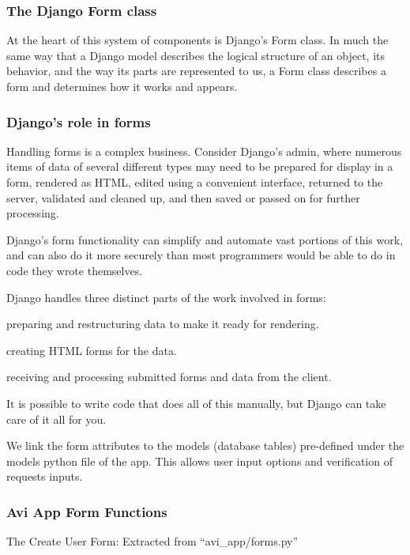 \documentclass[10pt]{article}
\begin{document}
\subsubsection{The Django Form class}
At the heart of this system of components is Django’s Form class. In much the same way that a Django model describes the logical structure of an object, its behavior, and the way its parts are represented to us, a Form class describes a form and determines how it works and appears.

\subsubsection{Django’s role in forms}

Handling forms is a complex business. Consider Django’s admin, where numerous items of data of several different types may need to be prepared for display in a form, rendered as HTML, edited using a convenient interface, returned to the server, validated and cleaned up, and then saved or passed on for further processing.

Django’s form functionality can simplify and automate vast portions of this work, and can also do it more securely than most programmers would be able to do in code they wrote themselves.

Django handles three distinct parts of the work involved in forms:

\begin{description}[font=$\bullet$~\normalfont\scshape\color{red!50!black}]
\item [] preparing and restructuring data to make it ready for rendering.
\item [] creating HTML forms for the data.
\item [] receiving and processing submitted forms and data from the client.
\end{description}

It is possible to write code that does all of this manually, but Django can take care of it all for you.

We link the form attributes to the models (database tables) pre-defined under the models python file of the app. This allows user input options and verification of requests inputs.

\subsubsection{Avi App Form Functions}
The Create User Form: Extracted from “avi\_app/forms.py”
\end{document}
